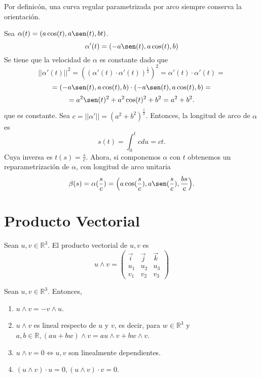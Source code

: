 \begin{obs}
  Por definicón, una curva regular parametrizada por arco siempre conserva la orientación.
\end{obs}

\begin{ejm}
  Sea $\alpha(t) = ( a \cos(t), a \sen(t), bt)$.
  \[ 
    \alpha'(t) = ( -a \sen(t), a \cos(t), b) 
  \]
  Se tiene que la velocidad de $\alpha$ es constante dado que 
  \[
    ||\alpha'(t)||^{2} = ((\alpha'(t)\cdot \alpha'(t))^{\frac{1}{2}})^{2} = \alpha'(t) \cdot \alpha'(t) =
  \]
  \[ 
    = ( -a \sen(t), a \cos(t), b) \cdot ( -a \sen(t), a \cos(t), b) =
  \] 
  \[ 
     = a^{2} \sen(t)^{2} + a^{2} \cos(t)^{2} + b^{2} = a^{2} + b^{2}.
  \]
  que es constante. Sea $c = ||\alpha'|| = (a^{2} + b^{2})^{\frac{1}{2}}$. Entonces, la longitud de arco de $\alpha$ es
  \[ 
    s(t) = \int^{t}_{0} c du = ct. 
  \] 
  Cuya inversa es $t(s) = \frac{s}{c}$. Ahora, si componemos $\alpha$ con $t$ obtenemos un reparametrización de $\alpha$, con longitud de arco unitaria
  \[ 
    \beta(s) = \alpha(\frac{s}{c}) = \Big ( a \cos(\frac{s}{c}), a \sen(\frac{s}{c}), \frac{bs}{c} \Big ) .
  \] 
\end{ejm}

\section{Producto Vectorial}

\begin{defn}
  Sean $u, v \in \mathbb{R}^{3}$. El producto vectorial de $u, v$ es
  \[ 
    u \wedge v = 
    \begin{pmatrix}
       \vec{i} & \vec{j} & \vec{k}\\
       u_{1} & u_{2} & u_{3}\\
       v_{1} & v_{2} & v_{3}
    \end{pmatrix}
  \] 
\end{defn}

\begin{prop}
  Sean $u, v \in \mathbb{R}^{3}$. Entonces,
  \begin{enumerate}[label=(\roman*)]
    \item $u \wedge v = -v \wedge u$.
    \item $u \wedge v$ es lineal respecto de $u$ y $v$, es decir, para $w \in \mathbb{R}^{3}$ y $a, b \in \mathbb{R}, (au + bw) \wedge v = au \wedge v + bw \wedge v$.
    \item $u \wedge v = 0 \Leftrightarrow u, v$ son linealmente dependientes.
    \item $(u \wedge v) \cdot u = 0, (u \wedge v) \cdot v = 0$.
  \end{enumerate}
\end{prop}

